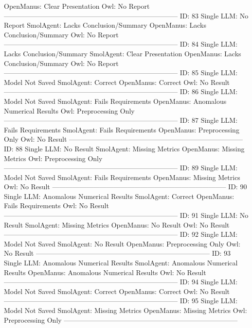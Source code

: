 \begin{tcolorbox}[colback=cadmiumgreen!5!white,colframe=forestgreen!75!white,breakable,title=\textit{Human evaluation results in task 4.}]
\begin{VerbatimWrap}
OpenManus: Clear Presentation 
Owl: No Report 
-----------------------------------------------------------------------------
ID: 83 
Single LLM: No Report 
SmolAgent: Lacks Conclusion/Summary 
OpenManus: Lacks Conclusion/Summary 
Owl: No Report 
-----------------------------------------------------------------------------
ID: 84 
Single LLM: Lacks Conclusion/Summary 
SmolAgent: Clear Presentation 
OpenManus: Lacks Conclusion/Summary 
Owl: No Report 
-----------------------------------------------------------------------------
ID: 85 
Single LLM: Model Not Saved 
SmolAgent: Correct 
OpenManus: Correct 
Owl: No Result 
-----------------------------------------------------------------------------
ID: 86 
Single LLM: Model Not Saved 
SmolAgent: Fails Requirements 
OpenManus: Anomalous Numerical Results 
Owl: Preprocessing Only 
-----------------------------------------------------------------------------
ID: 87 
Single LLM: Fails Requirements 
SmolAgent: Fails Requirements 
OpenManus: Preprocessing Only 
Owl: No Result 
-----------------------------------------------------------------------------
ID: 88 
Single LLM: No Result 
SmolAgent: Missing Metrics 
OpenManus: Missing Metrics 
Owl: Preprocessing Only 
-----------------------------------------------------------------------------
ID: 89 
Single LLM: Model Not Saved 
SmolAgent: Fails Requirements 
OpenManus: Missing Metrics 
Owl: No Result 
-----------------------------------------------------------------------------
ID: 90 
Single LLM: Anomalous Numerical Results 
SmolAgent: Correct 
OpenManus: Fails Requirements 
Owl: No Result 
-----------------------------------------------------------------------------
ID: 91 
Single LLM: No Result 
SmolAgent: Missing Metrics 
OpenManus: No Result 
Owl: No Result 
-----------------------------------------------------------------------------
ID: 92 
Single LLM: Model Not Saved 
SmolAgent: No Result 
OpenManus: Preprocessing Only 
Owl: No Result 
-----------------------------------------------------------------------------
ID: 93 
Single LLM: Anomalous Numerical Results 
SmolAgent: Anomalous Numerical Results 
OpenManus: Anomalous Numerical Results 
Owl: No Result 
-----------------------------------------------------------------------------
ID: 94 
Single LLM: Model Not Saved 
SmolAgent: Correct 
OpenManus: Correct 
Owl: No Result 
-----------------------------------------------------------------------------
ID: 95 
Single LLM: Model Not Saved 
SmolAgent: Missing Metrics 
OpenManus: Missing Metrics 
Owl: Preprocessing Only 
-----------------------------------------------------------------------------

\end{VerbatimWrap}
\end{tcolorbox}
